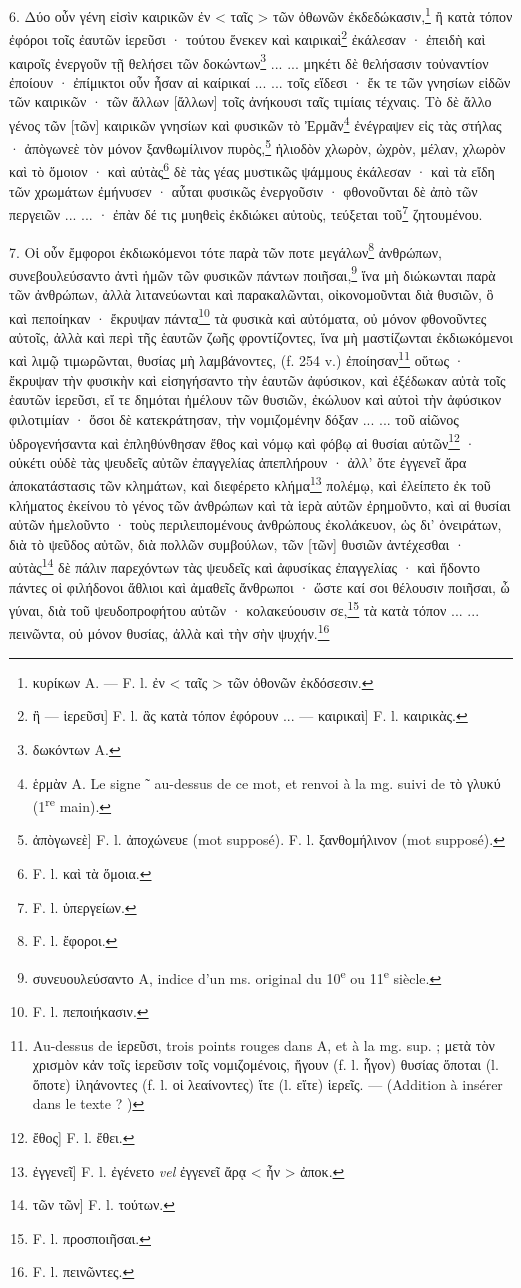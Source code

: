 \documentclass[landscape, a4paper, 11pt, oneside, polutonikogreek, french]{article}
\begin{document}
6. Δύο οὖν γένη εἰσὶν καιρικῶν ἐν < ταῖς > τῶν ὀθωνῶν ἐκδεδώκασιν,\footnote{κυρίκων A. --- F. l. ἐν < ταῖς > τῶν ὀθονῶν ἐκδόσεσιν.} ἢ κατὰ τόπον ἐφόροι τοῖς ἐαυτῶν ἱερεῦσι · τούτου ἕνεκεν καὶ καιρικαὶ\footnote{ἢ --- ἱερεῦσι] F. l. ἃς κατὰ τόπον ἐφόρουν ... --- καιρικαὶ] F. l. καιρικὰς.} ἐκάλεσαν · ἐπειδὴ καὶ καιροῖς ἐνεργοῦν τῇ θελήσει τῶν δοκώντων\footnote{δωκόντων A.} ... ... μηκέτι δὲ θελήσασιν τοὐναντίον ἐποίουν · ἐπίμικτοι οὖν ἦσαν αἱ καίρικαί ... ... τοῖς εἴδεσι · ἔκ τε τῶν γνησίων εἰδῶν τῶν καιρικῶν · τῶν ἄλλων [ἄλλων] τοῖς ἀνήκουσι ταῖς τιμίαις τέχναις. Τὸ δὲ ἄλλο γένος τῶν [τῶν] καιρικῶν γνησίων καὶ φυσικῶν τὸ Ἐρμᾶν\footnote{ἑρμὰν A. Le signe ῀ au-dessus de ce mot, et renvoi à la mg. suivi de τὸ γλυκύ (1\textsuperscript{re} main).} ἐνέγραψεν εἰς τὰς στήλας · ἀπὸγωνεὲ τὸν μόνον ξανθωμίλινον πυρὸς,\footnote{ἀπὸγωνεὲ] F. l. ἀποχώνευε (mot supposé). F. l. ξανθομήλινον (mot supposé).} ἡλιοδὸν χλωρὸν, ὠχρὸν, μέλαν, χλωρὸν καὶ τὸ ὅμοιον · καὶ αὐτὰς\footnote{F. l. καὶ τὰ ὅμοια.} δὲ τὰς γέας μυστικῶς ψάμμους ἐκάλεσαν · καὶ τὰ εἴδη τῶν χρωμάτων ἐμήνυσεν · αὗται φυσικῶς ἐνεργοῦσιν · φθονοῦνται δὲ ἀπὸ τῶν περγειῶν ... ... · ἐπὰν δέ τις μυηθεὶς ἐκδιώκει αὐτοὺς, τεύξεται τοῦ\footnote{F. l. ὑπεργείων.} ζητουμένου.

7. Οἱ οὖν ἔμφοροι ἐκδιωκόμενοι τότε παρὰ τῶν ποτε μεγάλων\footnote{F. l. ἔφοροι.} ἀνθρώπων, συνεβουλεύσαντο ἀντὶ ἡμῶν τῶν φυσικῶν πάντων ποιῆσαι,\footnote{συνευουλεύσαντο A, indice d'un ms. original du 10\textsuperscript{e} ou 11\textsuperscript{e} siècle.} ἵνα μὴ διώκωνται παρὰ τῶν ἀνθρώπων, ἀλλὰ λιτανεύωνται καὶ παρακαλῶνται, οἰκονομοῦνται διὰ θυσιῶν, ὃ καὶ πεποίηκαν · ἔκρυψαν πάντα\footnote{F. l. πεποιήκασιν.} τὰ φυσικὰ καὶ αὐτόματα, οὐ μόνον φθονοῦντες αὐτοῖς, ἀλλὰ καὶ περὶ τῆς ἑαυτῶν ζωῆς φροντίζοντες, ἵνα μὴ μαστίζωνται ἐκδιωκόμενοι καὶ λιμῷ τιμωρῶνται, θυσίας μὴ λαμβάνοντες, (f. 254 v.) ἐποίησαν\footnote{Au-dessus de ἱερεῦσι, trois points rouges dans A, et à la mg. sup. ; μετὰ τὸν χρισμὸν κἀν τοῖς ἱερεῦσιν τοῖς νομιζομένοις, ἥγουν (f. l. ἦγον) θυσίας ὅποται (l. ὅποτε) ἰληάνοντες (f. l. οἱ λεαίνοντες) ἴτε (l. εἴτε) ἱερεῖς. --- (Addition à insérer dans le texte ? )} οὕτως · ἔκρυψαν τὴν φυσικὴν καὶ εἰσηγήσαντο τὴν ἑαυτῶν ἀφύσικον, καὶ ἐξέδωκαν αὐτὰ τοῖς ἑαυτῶν ἱερεῦσι, εἴ τε δημόται ἠμέλουν τῶν θυσιῶν, ἐκώλυον καὶ αὐτοὶ τὴν ἀφύσικον φιλοτιμίαν · ὅσοι δὲ κατεκράτησαν, τὴν νομιζομένην δόξαν ... ... τοῦ αἰῶνος ὑδρογενήσαντα καὶ ἐπληθύνθησαν ἔθος καὶ νόμῳ καὶ φόβῳ αἱ θυσίαι αὐτῶν\footnote{ἔθος] F. l. ἔθει.} · οὐκέτι οὐδὲ τὰς ψευδεῖς αὐτῶν ἐπαγγελίας ἀπεπλήρουν · ἀλλ' ὅτε ἐγγενεῖ ἄρα ἀποκατάστασις τῶν κλημάτων, καὶ διεφέρετο κλήμα\footnote{ἐγγενεῖ] F. l. ἐγένετο \emph{vel} ἐγγενεῖ ἄρᾳ < ἦν > ἀποκ.} πολέμῳ, καὶ ἐλείπετο ἐκ τοῦ κλήματος ἐκείνου τὸ γένος τῶν ἀνθρώπων καὶ τὰ ἱερὰ αὐτῶν ἐρημοῦντο, καὶ αἱ θυσίαι αὐτῶν ἠμελοῦντο · τοὺς περιλειπομένους ἀνθρώπους ἐκολάκευον, ὡς δι' ὀνειράτων, διὰ τὸ ψεῦδος αὐτῶν, διὰ πολλῶν συμβούλων, τῶν [τῶν] θυσιῶν ἀντέχεσθαι · αὐτὰς\footnote{τῶν τῶν] F. l. τούτων.} δὲ πάλιν παρεχόντων τὰς ψευδεῖς καὶ ἀφυσίκας ἐπαγγελίας · καὶ ἥδοντο πάντες οἱ φιλήδονοι ἄθλιοι καὶ ἀμαθεῖς ἄνθρωποι · ὥστε καί σοι θέλουσιν ποιῆσαι, ὦ γύναι, διὰ τοῦ ψευδοπροφήτου αὐτῶν · κολακεύουσιν σε,\footnote{F. l. προσποιῆσαι.} τὰ κατὰ τόπον ... ... πεινῶντα, οὐ μόνον θυσίας, ἀλλὰ καὶ τὴν σὴν ψυχήν.\footnote{F. l. πεινῶντες.}
\end{document}
